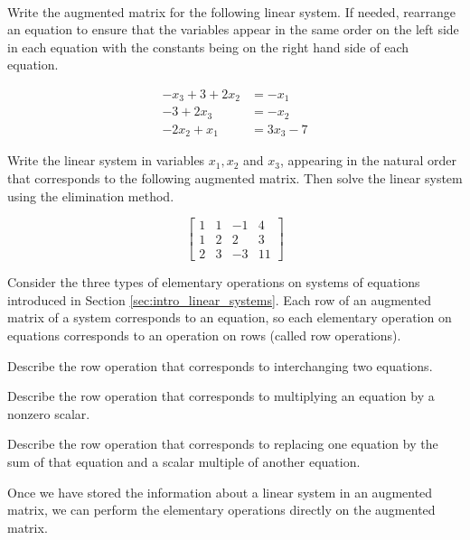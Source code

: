 \begin{pa} \label{pa:1_b} ~
\be 
\item Write the augmented matrix for the following linear system. If needed, rearrange an equation to ensure that the variables appear in the same order on the left side in each equation with the constants being on the right hand side of each equation. 

\begin{equation}
\begin{split}
-x_3 + 3 + 2x_2&= -x_1   \\
-3 + 2x_3 &= -x_2  \\
-2x_2 + x_1 &= 3x_3-7 
\end{split} 
\end{equation} 


\item Write the linear system in variables $x_1, x_2$ and $x_3$, appearing in the natural order that corresponds to the following augmented matrix. Then solve the linear system using the elimination method.

\[\left[ \begin{array}{rrr|r} 1 & 1 & -1 & 4 \\ 1 & 2 & 2 & 3 \\ 2 & 3 & -3 & 11 \end{array} \right]\]


\item Consider the three types of elementary operations on systems of equations introduced in Section \ref{sec:intro_linear_systems}. Each row of an augmented matrix of a system corresponds to an equation, so each elementary operation on equations corresponds to an operation on rows (called row operations). 
	\ba
	\item Describe the row operation that corresponds to interchanging two equations.
	\item Describe the row operation that corresponds to multiplying an equation by a nonzero scalar.
	\item Describe the row operation that corresponds to replacing one equation by the sum of that equation and a scalar multiple of another equation.
	\ea
 

\ee

\end{pa}



Once we have stored the information about a linear system in an augmented matrix, we can perform the elementary operations directly on the augmented matrix. 

